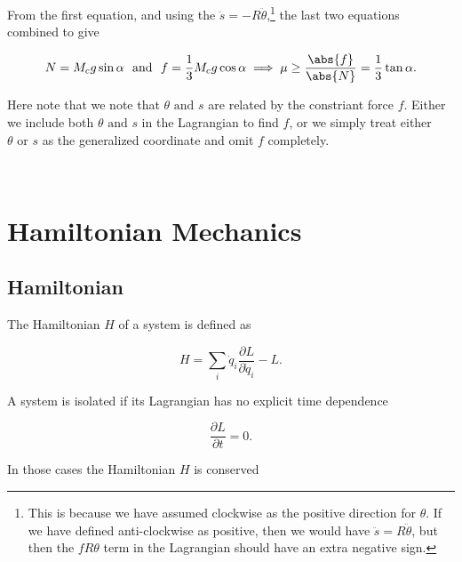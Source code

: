 \documentclass[a4paper,12pt]{report}
\begin{document}
{\begin{enumerate}
	From the first equation, and using the \(\ddot{s} = -R \ddot{\theta }  \),\footnote{This is because we have assumed clockwise as the positive direction for \(\theta \). If we have defined anti-clockwise as positive, then we would have \(\ddot{s} = R \ddot{\theta }  \), but then the \(fR \theta \) term in the Lagrangian should have an extra negative sign.} the last two equations combined to give 

	\begin{equation}
		N = M_{c}g \sin \alpha ~\text { and }~  f = \frac{1}{3} M_{c}g \cos \alpha \implies \mu \ge \frac{\abs{f}}{\abs{N}} = \frac{1}{3} \tan \alpha.
	\end{equation}

	Here note that we note that \(\theta \text { and } s\) are related by the constriant force \(f\). Either we include both \(\theta \text { and } s\) in the Lagrangian to find \(f\), or we simply treat either \(\theta \text { or } s\) as the generalized coordinate and omit \(f\) completely.    
\end{enumerate}
~
} 


\section{Hamiltonian Mechanics}

\subsection{Hamiltonian}

The Hamiltonian \(H\) of a system is defined as 

\begin{equation}
	H = \sum_{i}^{} \dot{q}_{i} \frac{\partial L}{\partial \dot{q}_{i}  } - L.    
\end{equation}


A system is isolated if its Lagrangian has no explicit time dependence

\begin{equation}
	\frac{\partial L}{\partial t} = 0.
\end{equation}

In those cases the Hamiltonian \(H\) is conserved 
\end{document}
